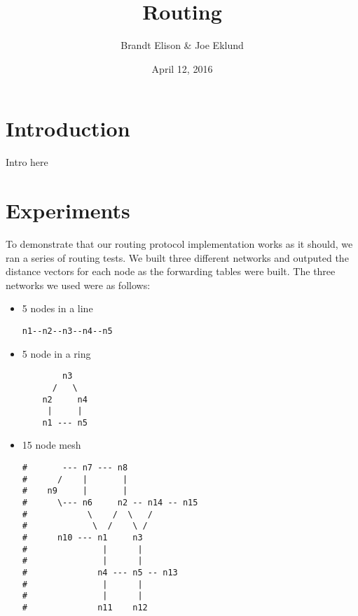 \documentclass[11pt]{article}
\begin{document}
\lstset{
  language=Python,
  basicstyle=\small,          %
  keywordstyle=\bfseries,
  identifierstyle=,           %
  commentstyle=,              %
  stringstyle=\ttfamily,      %
  showstringspaces=false,     %
  numbers=left,
  numberstyle=\tiny,
  numbersep=5pt,
  frame=tb
}

\title{Routing}

\author{Brandt Elison & Joe Eklund}

\date{April 12, 2016}

\maketitle

\section{Introduction}

Intro here

\section{Experiments}

To demonstrate that our routing protocol implementation works as it should, we ran a series of routing tests. We built three different networks and outputed the distance vectors for each node as the forwarding tables were built. The three networks we used were as follows:

\begin{itemize}
  \item 5 nodes in a line
   \begin{lstlisting} 
n1--n2--n3--n4--n5
\end{lstlisting}

  \item 5 node in a ring
   \begin{lstlisting} 
        n3 
      /   \
    n2     n4
     |     |
    n1 --- n5
\end{lstlisting}

  \item 15 node mesh
  \begin{lstlisting} 
#       --- n7 --- n8
#      /    |       |
#    n9     |       |
#      \--- n6     n2 -- n14 -- n15
#            \    /  \   /
#             \  /    \ /
#      n10 --- n1     n3
#               |      |
#               |      |
#              n4 --- n5 -- n13
#               |      |
#               |      |
#              n11    n12
\end{lstlisting}
\end{itemize}
\end{document}
